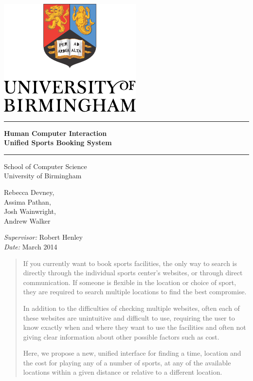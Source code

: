 \begin{titlepage}
    \begin{center}
    \vspace*{\fill}

    \centering
    \includegraphics[scale=1.0]{Logo.pdf}
    \vfill

    \hrule
    {\LARGE\bf Human Computer Interaction \\[0.4cm]
        Unified Sports Booking System\\[0.4cm]}
    \hrule

    \vfill
    \large
    School of Computer Science\\
    University of Birmingham

    \vfill{
        Rebecca Devney,\\
        Assima Pathan,\\
        Josh Wainwright,\\
        Andrew Walker}
    \vfill

    \vfill
    \textit{Supervisor:} Robert Henley \\
    \vfill
    \textit{Date:} March 2014
    \vfill
    \vfill

    \begin{abstract}
        If you currently want to book sports facilities, the only way to search is
        directly through the individual sports center's websites, or through direct
        communication. If someone is flexible in the location or choice of sport, they
        are required to search multiple locations to find the best compromise.

        In addition to the difficulties of checking multiple websites, often each of
        these websites are unintuitive and difficult to use, requiring the user to know
        exactly when and where they want to use the facilities and often not giving clear
        information about other possible factors such as cost.


        Here, we propose a new, unified interface for finding a time, location 
        and the cost for playing any of a number of sports, at any of the 
        available locations within a given distance or relative to a different
        location.
    \end{abstract}


    \end{center}
\end{titlepage}


